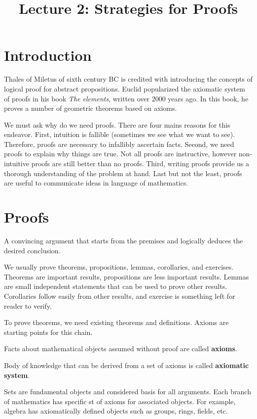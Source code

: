 \documentclass[a4paper,english,12pt]{article}
\begin{document}
\title{Lecture 2: Strategies for Proofs}
\author{}
\maketitle

\section{Introduction}
Thales of Miletus of sixth century BC is credited with introducing the concepts of logical proof for abstract propositions. Euclid popularized the axiomatic system of proofs in his book \emph{The elements}, written over 2000 years ago. In this book, he proves a number of geometric theorems based on axioms.

We must ask why do we need proofs. There are four mains reasons for this endeavor. First, intuition is fallible (sometimes we see what we want to see). Therefore, proofs are necessary to infallibly ascertain facts. Second, we need proofs to explain why things are true. Not all proofs are instructive, however non-intuitive proofs are still better than no proofs. Third, writing proofs provide us a thorough understanding of the problem at hand. Last but not the least, proofs are useful to communicate ideas in language of mathematics. 

\section{Proofs}
\begin{defn} A convincing argument that starts from the premises and logically deduces the desired conclusion.
\end{defn}
We usually prove theorems, propositions, lemmas, corollaries, and exercises. Theorems are important results, propositions are less important results. Lemmas are small independent statements that can be used to prove other results. Corollaries follow easily from other results, and exercise is something left for reader to verify. 

To prove theorems, we need existing theorems and definitions. Axioms are starting points for this chain.
\begin{defn}[Axioms] Facts about mathematical objects assumed without proof are called \textbf{axioms}.
\end{defn}
\begin{defn} Body of knowledge that can be derived from a set of axioms is called \textbf{axiomatic system}.
\end{defn}
Sets are fundamental objects and considered basis for all arguments. Each branch of mathematics has specific st of axioms for associated objects. For example, algebra has axiomatically defined objects such as groups, rings, fields, etc.
\end{document}
